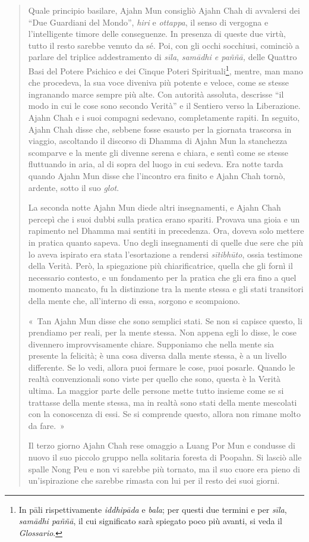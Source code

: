 \begin{quote}
Quale principio basilare, Ajahn Mun consigliò Ajahn Chah di avvalersi
dei ``Due Guardiani del Mondo'', \emph{hiri} e \emph{ottappa}, il senso
di vergogna e l'intelligente timore delle conseguenze. In presenza di
queste due virtù, tutto il resto sarebbe venuto da sé. Poi, con gli
occhi socchiusi, cominciò a parlare del triplice addestramento di
\emph{sīla}, \emph{samādhi e paññā,} delle Quattro Basi del Potere
Psichico e dei Cinque Poteri Spirituali\footnote{In pāli rispettivamente
  \emph{iddhipāda} e \emph{bala}; per questi due termini e per
  \emph{sīla}, \emph{samādhi paññā}, il cui significato sarà spiegato
  poco più avanti, si veda il \emph{Glossario}.}, mentre, man mano che
procedeva, la sua voce diveniva più potente e veloce, come se stesse
ingranando marce sempre più alte. Con autorità assoluta, descrisse ``il
modo in cui le cose sono secondo Verità'' e il Sentiero verso la
Liberazione. Ajahn Chah e i suoi compagni sedevano, completamente
rapiti. In seguito, Ajahn Chah disse che, sebbene fosse esausto per la
giornata trascorsa in viaggio, ascoltando il discorso di Dhamma di Ajahn
Mun la stanchezza scomparve e la mente gli divenne serena e chiara, e
sentì come se stesse fluttuando in aria, al di sopra del luogo in cui
sedeva. Era notte tarda quando Ajahn Mun disse che l'incontro era finito
e Ajahn Chah tornò, ardente, sotto il suo \emph{glot}.

La seconda notte Ajahn Mun diede altri insegnamenti, e Ajahn Chah
percepì che i suoi dubbi sulla pratica erano spariti. Provava una gioia
e un rapimento nel Dhamma mai sentiti in precedenza. Ora, doveva solo
mettere in pratica quanto sapeva. Uno degli insegnamenti di quelle due
sere che più lo aveva ispirato era stata l'esortazione a rendersi
\emph{sītibhūto}, ossia testimone della Verità. Però, la spiegazione più
chiarificatrice, quella che gli fornì il necessario contesto, e un
fondamento per la pratica che gli era fino a quel momento mancato, fu la
distinzione tra la mente stessa e gli stati transitori della mente che,
all'interno di essa, sorgono e scompaiono.

«~Tan Ajahn Mun disse che sono semplici stati. Se non si capisce questo,
li prendiamo per reali, per la mente stessa. Non appena egli lo disse,
le cose divennero improvvisamente chiare. Supponiamo che nella mente sia
presente la felicità; è una cosa diversa dalla mente stessa, è a un
livello differente. Se lo vedi, allora puoi fermare le cose, puoi
posarle. Quando le realtà convenzionali sono viste per quello che sono,
questa è la Verità ultima. La maggior parte delle persone mette tutto
insieme come se si trattasse della mente stessa, ma in realtà sono stati
della mente mescolati con la conoscenza di essi. Se si comprende questo,
allora non rimane molto da fare.~»

Il terzo giorno Ajahn Chah rese omaggio a Luang Por Mun e condusse di
nuovo il suo piccolo gruppo nella solitaria foresta di Poopahn. Si
lasciò alle spalle Nong Peu e non vi sarebbe più tornato, ma il suo
cuore era pieno di un'ispirazione che sarebbe rimasta con lui per il
resto dei suoi giorni.
\end{quote}

